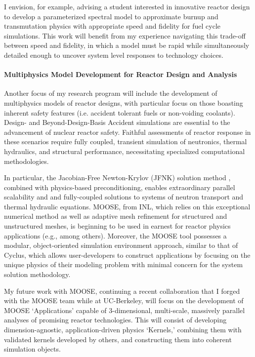 \documentclass[a4paper, 10pt]{article}
\begin{document}
I envision, for example, advising a student interested in innovative reactor 
design to develop a parameterized spectral model to approximate burnup and 
transmutation physics with appropriate speed and fidelity for fuel cycle 
simulations.  This work will benefit from my experience navigating this 
trade-off between speed and fidelity, in which a model must be rapid while 
simultaneously detailed enough to uncover system level responses to technology 
choices.


\paragraph{Multiphysics Model Development for Reactor Design and Analysis}

Another focus of my research program will include the development of 
multiphysics models of reactor designs, with particular focus on those boasting 
inherent safety features (i.e. accident tolerant fuels or non-voiding coolants).  
Design- and Beyond-Design-Basis Accident simulations are essential to the 
advancement of nuclear reactor safety. Faithful assessments of reactor response 
in these scenarios require fully coupled, transient simulation of neutronics, 
thermal hydraulics, and structural performance, necessitating specialized 
computational methodologies. 

In particular, the Jacobian-Free Newton-Krylov (JFNK) solution method 
\cite{knoll_jacobian-free_2004}, combined with 
physics-based preconditioning, enables extraordinary parallel scalability and 
and fully-coupled solutions to systems of neutron transport and thermal 
hydraulic equations. MOOSE, from INL, which relies on this exceptional numerical 
method as well as adaptive mesh refinement for structured and 
unstructured meshes, is beginning to be used in earnest for reactor physics 
applications (e.g., \cite{park_tightly_2009, short_multiphysics_2013, 
novascone_assessment_2012, novascone_multidimensional_2012, 
gaston_parallel_2009} among others). Moreover, the MOOSE tool possesses a 
modular, object-oriented simulation environment approach, similar to that of 
Cyclus, which allows user-developers to construct applications by focusing on 
the unique physics of their modeling problem  with minimal concern for the 
system solution methodology. 

My future work with MOOSE, continuing a recent collaboration that I forged with the 
MOOSE team while at UC-Berkeley, will focus on the development 
of MOOSE `Applications' capable of 3-dimensional, multi-scale, massively parallel 
analyses of promising reactor technologies. This will consist of developing 
dimension-agnostic, application-driven physics 
`Kernels,' combining them with validated kernels developed by others, and 
constructing them into coherent simulation objects. 
\end{document}
